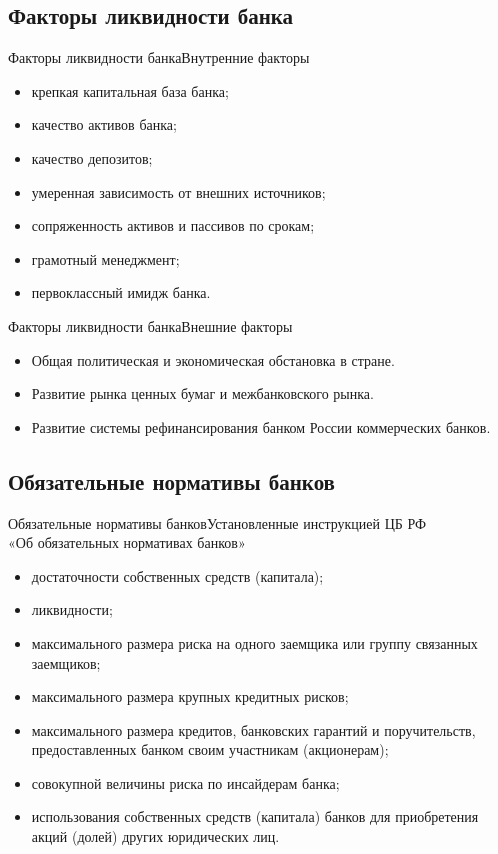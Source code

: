 \documentclass[_Banking_p2.tex]{subfiles}
\begin{document}
\subsection{Факторы ликвидности банка}
\begin{frame}{Факторы ликвидности банка}{Внутренние факторы}
\begin{itemize}[<+->]
\item
крепкая капитальная база банка;
\item
качество активов банка; 
\item
качество депозитов;
\item
умеренная зависимость от внешних источников;
\item
сопряженность активов и пассивов по срокам;
\item
грамотный менеджмент;
\item
первоклассный имидж банка.
\end{itemize}
\end{frame}

\begin{frame}{Факторы ликвидности банка}{Внешние факторы}
\begin{itemize}[<+->]
\item
Общая политическая и экономическая обстановка в стране.
\item
Развитие рынка ценных бумаг и межбанковского рынка.
\item
Развитие системы рефинансирования банком России коммерческих банков.
\end{itemize}
\end{frame}

\subsection{Обязательные нормативы банков}
\begin{frame}[ allowframebreaks]{Обязательные нормативы банков}{Установленные инструкцией ЦБ РФ \\«Об обязательных нормативах банков»}
\begin{itemize}
\item
достаточности собственных средств (капитала);
\item
ликвидности;
\item
максимального размера риска на одного заемщика или группу связанных заемщиков;
\item
максимального размера крупных кредитных рисков;
\pagebreak
\item
максимального размера кредитов, банковских гарантий и поручительств, предоставленных банком своим участникам (акционерам);
\item
совокупной величины риска по инсайдерам банка;
\item
использования собственных средств (капитала) банков для приобретения акций (долей) других юридических лиц.
\end{itemize}
\end{frame}
\end{document}
